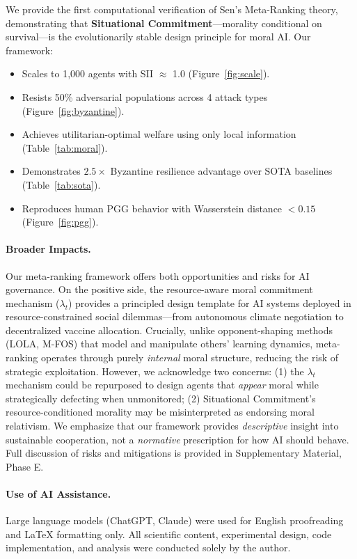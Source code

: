 \documentclass{article}
\begin{document}
We provide the first computational verification of Sen's Meta-Ranking theory, demonstrating that \textbf{Situational Commitment}---morality conditional on survival---is the evolutionarily stable design principle for moral AI. Our framework:
\begin{itemize}
    \item Scales to 1,000 agents with SII $\approx$ 1.0 (Figure~\ref{fig:scale}).
    \item Resists 50\% adversarial populations across 4 attack types (Figure~\ref{fig:byzantine}).
    \item Achieves utilitarian-optimal welfare using only local information (Table~\ref{tab:moral}).
    \item Demonstrates $2.5\times$ Byzantine resilience advantage over SOTA baselines (Table~\ref{tab:sota}).
    \item Reproduces human PGG behavior with Wasserstein distance $< 0.15$ (Figure~\ref{fig:pgg}).
\end{itemize}

\paragraph{Broader Impacts.}
Our meta-ranking framework offers both opportunities and risks for AI governance. On the positive side, the resource-aware moral commitment mechanism ($\lambda_t$) provides a principled design template for AI systems deployed in resource-constrained social dilemmas---from autonomous climate negotiation to decentralized vaccine allocation. Crucially, unlike opponent-shaping methods (LOLA, M-FOS) that model and manipulate others' learning dynamics, meta-ranking operates through purely \textit{internal} moral structure, reducing the risk of strategic exploitation.
However, we acknowledge two concerns: (1) the $\lambda_t$ mechanism could be repurposed to design agents that \textit{appear} moral while strategically defecting when unmonitored; (2) Situational Commitment's resource-conditioned morality may be misinterpreted as endorsing moral relativism. We emphasize that our framework provides \textit{descriptive} insight into sustainable cooperation, not a \textit{normative} prescription for how AI should behave. Full discussion of risks and mitigations is provided in Supplementary Material, Phase E.

\paragraph{Use of AI Assistance.} Large language models (ChatGPT, Claude) were used for English proofreading and LaTeX formatting only. All scientific content, experimental design, code implementation, and analysis were conducted solely by the author.



\end{document}
